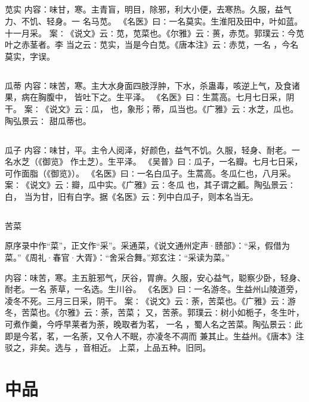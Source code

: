 \documentclass[12pt,UTF8]{ctexbook}
\begin{document}
\section{}苋实
内容：味甘，寒。主青盲，明目，除邪，利大小便，去寒热。久服，益气力、不饥、轻身。一 
名马苋。 
《名医》曰∶一名莫实。生淮阳及田中，叶如蓝。十一月采。 
案∶《说文》云∶苋，苋菜也。《尔雅》云∶蒉，赤苋。郭璞云∶今苋叶之赤茎者。李 
当之云∶苋实，当是今白苋。《唐本注》云∶赤苋，一名 ，今名莫实，字误。 


\section{}瓜蒂
内容：味苦，寒。主大水身面四肢浮肿，下水，杀蛊毒，咳逆上气，及食诸果，病在胸腹中， 
皆吐下之。生平泽。 
《名医》曰∶生蒿高。七月七日采，阴干。 
案∶《说文》云∶瓜， 也，象形；蒂，瓜当也。《广雅》云∶水芝，瓜也。陶弘景云∶ 
甜瓜蒂也。 


\section{}瓜子
内容：味甘，平。主令人阅泽，好颜色，益气不饥。久服，轻身、耐老。一名水芝（《御览》 
作土芝）。生平泽。 
《吴普》曰∶瓜子，一名瓣。七月七日采，可作面脂（《御览》）。 
《名医》曰∶一名白瓜子。生蒿高。冬瓜仁也，八月采。 
案∶《说文》云∶瓣，瓜中实。《广雅》云∶冬瓜 也，其子谓之瓤。陶弘景云∶白， 
当为甘，旧有白字。据《名医》云∶列中白瓜子，则本名当无。 


\section{}苦菜

原序录中作“菜”，正文作“采”。采通菜，《说文通州定声·赜部》：“采，假借为菜。”《周礼·春官·大胥》：“舍采合舞。”郑玄注：“采读为菜。”

内容：味苦，寒。主五脏邪气，厌谷，胃痹。久服，安心益气，聪察少卧，轻身、耐老。一名 
荼草，一名选。生川谷。 
《名医》曰∶一名游冬。生益州山陵道旁，凌冬不死。三月三日采，阴干。 
案∶《说文》云∶荼，苦菜也。《广雅》云∶游冬，苦菜也。《尔雅》云∶荼，苦菜； 
又，苦荼。郭璞云∶树小如栀子，冬生叶，可煮作羹，今呼早莱者为荼，晚取者为茗， 
一名 ，蜀人名之苦菜。陶弘景云∶此即是今茗，茗，一名荼，又令人不眠，亦凌冬不凋而 
兼其止。生益州。《唐本》注驳之，非矣。选与 ，音相近。 
上菜，上品五种。旧同。 

\chapter{中品}
\end{document}
